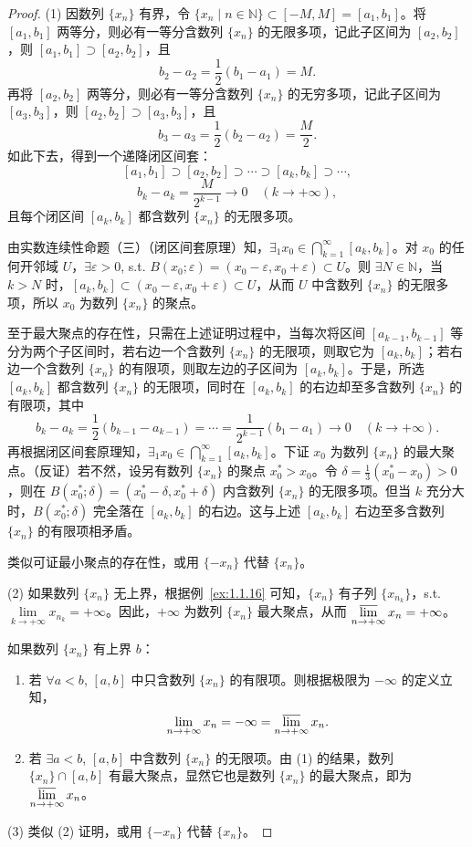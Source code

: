\begin{proof}
(1) 因数列 $\{x_n\}$ 有界，令 $\{x_n \mid n \in \mathbb{N}\} \subset [-M, M] = [a_1, b_1]$。将 $[a_1, b_1]$ 两等分，则必有一等分含数列 $\{x_n\}$ 的无限多项，记此子区间为 $[a_2, b_2]$，则 $[a_1, b_1] \supset [a_2, b_2]$，且
\[
b_2 - a_2 = \frac{1}{2}(b_1 - a_1) = M.
\]
再将 $[a_2, b_2]$ 两等分，则必有一等分含数列 $\{x_n\}$ 的无穷多项，记此子区间为 $[a_3, b_3]$，则 $[a_2, b_2] \supset [a_3, b_3]$，且
\[
b_3 - a_3 = \frac{1}{2}(b_2 - a_2) = \frac{M}{2}.
\]
如此下去，得到一个递降闭区间套：
\[
[a_1, b_1] \supset [a_2, b_2] \supset \cdots \supset [a_k, b_k] \supset \cdots,
\]
\[
b_k - a_k = \frac{M}{2^{k-1}} \to 0\quad (k \to +\infty),
\]
且每个闭区间 $[a_k, b_k]$ 都含数列 $\{x_n\}$ 的无限多项。

由实数连续性命题（三）（闭区间套原理）知，$\exists_1 x_0 \in \bigcap_{k=1}^\infty [a_k, b_k]$。对 $x_0$ 的任何开邻域 $U$，$\exists \varepsilon > 0$, s.t. $B(x_0; \varepsilon) = (x_0 - \varepsilon, x_0 + \varepsilon) \subset U$。则 $\exists N \in \mathbb{N}$，当 $k > N$ 时，$[a_k, b_k] \subset (x_0 - \varepsilon, x_0 + \varepsilon) \subset U$，从而 $U$ 中含数列 $\{x_n\}$ 的无限多项，所以 $x_0$ 为数列 $\{x_n\}$ 的聚点。

至于最大聚点的存在性，只需在上述证明过程中，当每次将区间 $[a_{k-1}, b_{k-1}]$ 等分为两个子区间时，若右边一个含数列 $\{x_n\}$ 的无限项，则取它为 $[a_k, b_k]$；若右边一个含数列 $\{x_n\}$ 的有限项，则取左边的子区间为 $[a_k, b_k]$。于是，所选 $[a_k, b_k]$ 都含数列 $\{x_n\}$ 的无限项，同时在 $[a_k, b_k]$ 的右边却至多含数列 $\{x_n\}$ 的有限项，其中
\[
b_k - a_k = \frac{1}{2}(b_{k-1} - a_{k-1}) = \cdots = \frac{1}{2^{k-1}}(b_1 - a_1) \to 0\quad (k \to +\infty).
\]
再根据闭区间套原理知，$\exists_1 x_0 \in \bigcap_{k=1}^\infty [a_k, b_k]$。下证 $x_0$ 为数列 $\{x_n\}$ 的最大聚点。（反证）若不然，设另有数列 $\{x_n\}$ 的聚点 $x_0^* > x_0$。令 $\delta = \frac{1}{3}(x_0^* - x_0) > 0$，则在 $B(x_0^*; \delta) = (x_0^* - \delta, x_0^* + \delta)$ 内含数列 $\{x_n\}$ 的无限多项。但当 $k$ 充分大时，$B(x_0^*; \delta)$ 完全落在 $[a_k, b_k]$ 的右边。这与上述 $[a_k, b_k]$ 右边至多含数列 $\{x_n\}$ 的有限项相矛盾。

类似可证最小聚点的存在性，或用 $\{-x_n\}$ 代替 $\{x_n\}$。

(2) 如果数列 $\{x_n\}$ 无上界，根据例~\ref{ex:1.1.16} 可知，$\{x_n\}$ 有子列 $\{x_{n_k}\}$，s.t. $\lim\limits_{k\to+\infty} x_{n_k} = +\infty$。因此，$+\infty$ 为数列 $\{x_n\}$ 最大聚点，从而 $\varlimsup\limits_{n\to+\infty} x_n = +\infty$。

如果数列 $\{x_n\}$ 有上界 $b$：
\begin{enumerate}
    \item[①] 若 $\forall a < b$, $[a, b]$ 中只含数列 $\{x_n\}$ 的有限项。则根据极限为 $-\infty$ 的定义立知，
    \[
    \lim_{n\to+\infty} x_n = -\infty = \varlimsup_{n\to+\infty} x_n.
\]
    \item[②] 若 $\exists a < b$, $[a, b]$ 中含数列 $\{x_n\}$ 的无限项。由 (1) 的结果，数列 $\{x_n\} \cap [a, b]$ 有最大聚点，显然它也是数列 $\{x_n\}$ 的最大聚点，即为 $\varlimsup\limits_{n\to+\infty} x_n$。
\end{enumerate}

(3) 类似 (2) 证明，或用 $\{-x_n\}$ 代替 $\{x_n\}$。
\end{proof}

